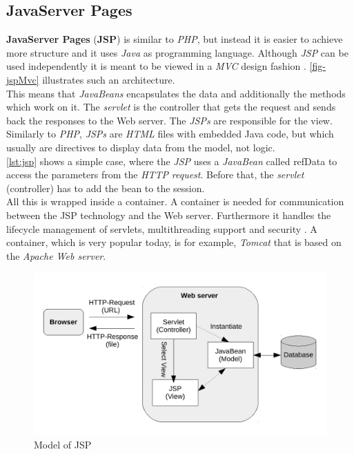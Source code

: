 \documentclass[
  a4paper,               %
  twoside,               %
  headings=small,        %
  DIV=12,                %
  BCOR=1cm,              %
  headinclude=true,      %
  footinclude=true,      %
  numbers=noenddot,      %
  11pt]{scrartcl}        %
\begin{document}
\subsection{JavaServer Pages}

\textbf{JavaServer Pages} (\textbf{JSP}) is similar to \textit{PHP}, but instead it is easier to achieve more structure and it uses \textit{Java} as programming language. Although \textit{JSP} can be used independently it is meant to be viewed in a \textit{MVC} design fashion \cite{downey2008web}. \autoref{fig-jspMvc} illustrates such an architecture.\\
This means that \textit{JavaBeans} encapsulates the data and additionally the methods which work on it. The \textit{servlet} is the controller that gets the request and sends back the responses to the Web server. The \textit{JSPs} are responsible for the view. Similarly to \textit{PHP}, \textit{JSPs} are \textit{HTML} files with embedded Java code, but which usually are directives to display data from the model, not logic.\\
\autoref{lst:jsp} shows a simple case, where the \textit{JSP} uses a \textit{JavaBean} called refData to access the parameters from the \textit{HTTP} \textit{request}. Before that, the \textit{servlet} (controller) has to add the bean to the session.\\
All this is wrapped inside a container. A container is needed for communication between the JSP technology and the Web server. Furthermore it handles the lifecycle management of servlets, multithreading support and security \cite{downey2008web}. A container, which is very popular today, is for example, \textit{Tomcat} that is based on the \textit{Apache Web server}.

\begin{figure}[h]
  \centerline{\includegraphics[width=12cm]{pics/jspMVC.pdf}}
  \caption{Model of JSP}
  \label{fig-jspMvc}
\end{figure}
\end{document}
